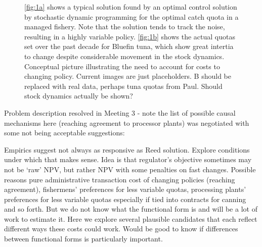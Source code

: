 \documentclass[authoryear, review, 12pt]{elsarticle}
\begin{document}
\begin{figure}[ht]
  \begin{center}
  \end{center}
  \caption{\ref{fig:1a} shows a typical solution found by an optimal
  control solution by stochastic dynamic programming for the optimal catch
  quota in a managed fishery.  Note that the solution tends to track the
  noise, resulting in a highly variable policy.  \ref{fig:1b} shows the
  actual quotas set over the past decade for Bluefin tuna, which show
  great intertia to change despite considerable movement in the stock
  dynamics.  {\color{green}Conceptual picture illustrating the need to account
  for costs to changing policy. Current images are just placeholders.
  B should be replaced with real data, perhaps tuna quotas from Paul.
  Should stock dynamics actually be shown?}}
  \label{fig:1}
\end{figure}


{\color{blue}
 Problem description resolved in Meeting 3 - note the list of possible causal mechanisms here (reaching agreement to processor plants) was negotiated with some not being acceptable suggestions: 

 Empirics suggest not always as responsive as Reed solution. Explore conditions under which that makes sense. Idea is that regulator’s objective sometimes may not be `raw' NPV, but rather NPV with some penalties on fast changes. Possible reasons pure administrative transaction cost of changing policies (reaching agreement), fishermens' preferences for less variable quotas, processing plants' preferences for less variable quotas especially if tied into contracts for canning and so forth. But we do not know what the functional form is and will be a lot of work to estimate it. Here we explore several plausible candidates that each reflect different ways these costs could work. Would be good to know if differences between functional forms is particularly important.
}
\end{document}
